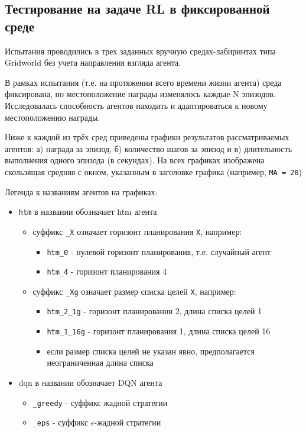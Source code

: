 \documentclass[a4paper]{article}
\begin{document}
\subsection{Тестирование на задаче RL в фиксированной среде}

Испытания проводились в трех заданных вручную средах-лабиринтах типа Gridworld без учета направления взгляда агента.

В рамках испытания (т.е. на протяжении всего времени жизни агента) среда фиксирована, но местоположение награды изменялось каждые N эпизодов. Исследовалась способность агентов находить и адаптироваться к новому местоположению награды.

Ниже к каждой из трёх сред приведены графики результатов рассматриваемых агентов: а) награда за эпизод, б) количество шагов за эпизод и в) длительность выполнения одного эпизода (в секундах). На всех графиках изображена скользящая средняя с окном, указанным в заголовке графика (например, \verb|MA = 20|)

Легенда к названиям агентов на графиках:

\begin{itemize}
    \item \verb|htm| в названии обозначает htm агента
    \begin{itemize}
        \item суффикс \verb|_X| означает горизонт планирования \verb|X|, например:
        \begin{itemize}
            \item \verb|htm_0| - нулевой горизонт планирования, т.е. случайный агент
            \item \verb|htm_4| - горизонт планирования 4
        \end{itemize}
        
        \item суффикс \verb|_Xg| означает размер списка целей \verb|X|, например:
        \begin{itemize}
            \item \verb|htm_2_1g| - горизонт планирования 2, длина списка целей 1
            \item \verb|htm_1_16g| - горизонт планирования 1, длина списка целей 16
            \item если размер списка целей не указан явно, предполагается неограниченная длина списка
        \end{itemize}
    \end{itemize}
    
    \item dqn в названии обозначает DQN агента
    \begin{itemize}
        \item \verb|_greedy| - суффикс жадной стратегии
        \item \verb|_eps| - суффикс $\epsilon$-жадной стратегии
    \end{itemize}
\end{itemize}
\end{document}
